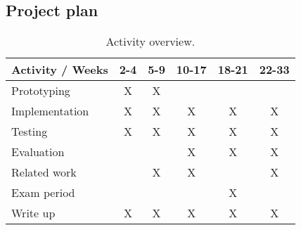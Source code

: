 \documentclass[preprint,10pt,numbers]{sigplanconf}
\begin{document}
  \subsection{Project plan}
  \begin{table}[H]
    \centering
    \begin{tabular}{ | l | c | c | c | c | c | }
      \hline
      \multicolumn{1}{|c|}{Activity / Weeks} & 2-4 & 5-9 & 10-17 & 18-21 & 22-33 \\
      \hline
      Prototyping    & X & X & & & \\
      \hline
      Implementation & X & X & X & X & X \\
      \hline
      Testing        & X & X & X & X & X \\
      \hline
      Evaluation     &   &   & X & X & X \\
      \hline
      Related work   &   & X & X &   & X \\
      \hline
      Exam period    &   &   &   & X &   \\
      \hline
      Write up       & X & X & X & X & X  \\
      \hline
    \end{tabular}\caption{Activity overview.}
  \end{table}

\softraggedright
\nocite{*}

\end{document}
